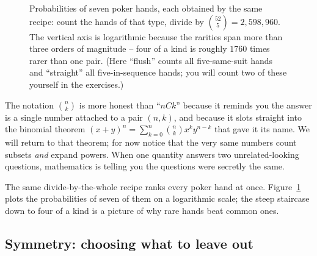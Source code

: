 \begin{figure}[H]
\centering
{}
\caption{Probabilities of seven poker hands, each obtained by the same recipe: count the
hands of that type, divide by $\binom{52}{5}=2{,}598{,}960$. The vertical axis is
logarithmic because the rarities span more than three orders of magnitude -- four of a kind
is roughly $1760$ times rarer than one pair. (Here ``flush'' counts all five-same-suit hands
and ``straight'' all five-in-sequence hands; you will count two of these yourself in the
exercises.)}
\label{ch2:fig-poker}
\end{figure}

\begin{aestheticbox}
The notation $\binom{n}{k}$ is more honest than ``$nCk$'' because it reminds you the answer
is a single number attached to a pair $(n,k)$, and because it slots straight into the
binomial theorem
$(x+y)^n = \sum_{k=0}^n \binom{n}{k} x^k y^{n-k}$ that gave it its name. We will return to
that theorem; for now notice that the very same numbers count subsets \emph{and} expand
powers. When one quantity answers two unrelated-looking questions, mathematics is telling
you the questions were secretly the same.
\end{aestheticbox}

The same divide-by-the-whole recipe ranks every poker hand at once.
Figure~\ref{ch2:fig-poker} plots the probabilities of seven of them on a logarithmic
scale; the steep staircase down to four of a kind is a picture of why rare hands beat
common ones.

\subsection{Symmetry: choosing what to leave out}

